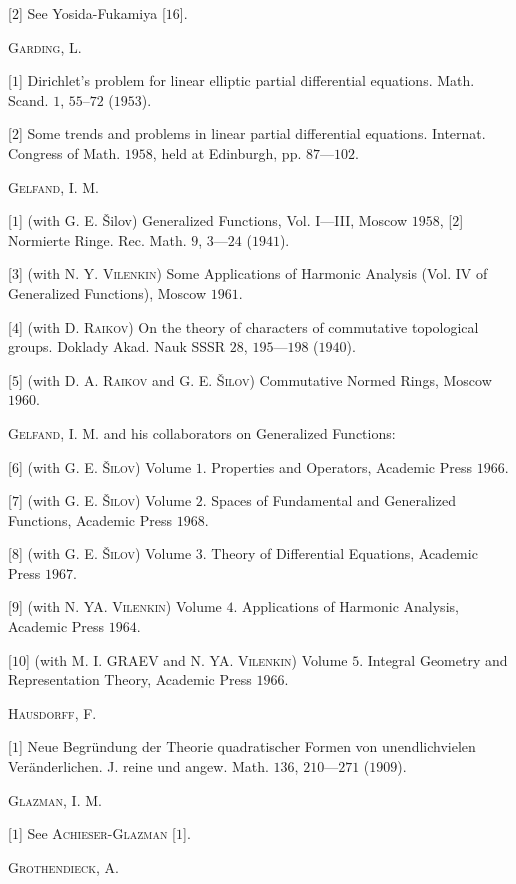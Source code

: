 [$2$] See Yosida-Fukamiya [$16$]. 

\textsc{Garding}, L. 

[$1$] Dirichlet's problem for linear elliptic partial differential equations. Math. Scand. $1$, $55$--$72$ ($1953$). 

[$2$] Some trends and problems in linear partial differential equations. Internat. Congress of Math. $1958$, held at Edinburgh, pp. $87$---$102$. 

\textsc{Gelfand}, I. M. 

[$1$] (with G. E. Šilov) Generalized Functions, Vol. I---III, Moscow $1958$, [$2$] Normierte Ringe. Rec. Math. $9$, $3$---$24$ ($1941$). 

[$3$] (with N. Y. \textsc{Vilenkin}) Some Applications of Harmonic Analysis (Vol. IV of Generalized Functions), Moscow $1961$. 

[$4$] (with D. \textsc{Raikov}) On the theory of characters of commutative topological groups. Doklady Akad. Nauk SSSR $28$, $195$---$198$ ($1940$). 

[$5$] (with D. A. \textsc{Raikov} and G. E. \textsc{Šilov}) Commutative Normed Rings, Moscow $1960$. 

\textsc{Gelfand}, I. M. and his collaborators on Generalized Functions: 

[$6$] (with G. E. \textsc{Šilov}) Volume $1$. Properties and Operators, Academic Press $1966$. 

[$7$] (with G. E. \textsc{Šilov}) Volume $2$. Spaces of Fundamental and Generalized Functions, Academic Press $1968$. 

[$8$] (with G. E. \textsc{Šilov}) Volume $3$. Theory of Differential Equations, Academic Press $1967$. 

[$9$] (with N. YA. \textsc{Vilenkin}) Volume $4$. Applications of Harmonic Analysis, Academic Press $1964$. 

[$10$] (with M. I. GRAEV and N. YA. \textsc{Vilenkin}) Volume $5$. Integral Geometry and Representation Theory, Academic Press $1966$. 

\textsc{Hausdorff}, F. 

[$1$] Neue Begründung der Theorie quadratischer Formen von unendlichvielen Veränderlichen. J. reine und angew. Math. $136$, $210$---$271$ ($1909$). 

\textsc{Glazman}, I. M. 

[$1$] See \textsc{Achieser}-\textsc{Glazman} [$1$]. 

\textsc{Grothendieck}, A. 

